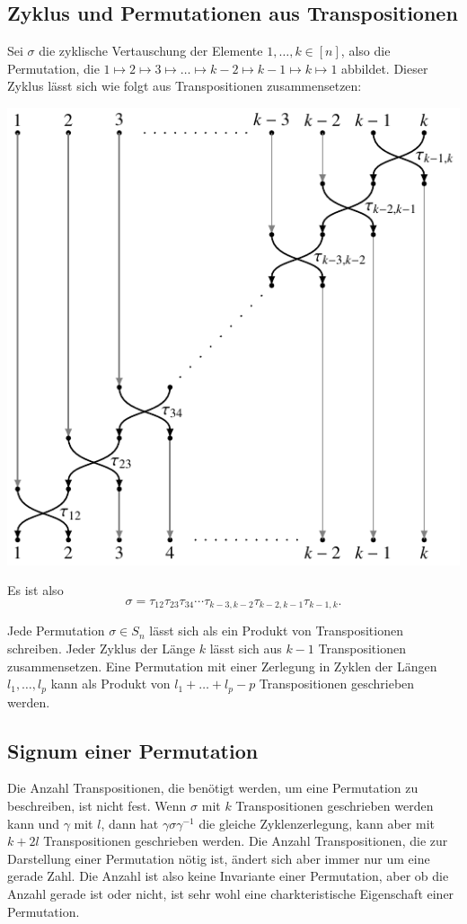 \subsection{Zyklus und Permutationen aus Transpositionen}
Sei $\sigma$ die zyklische Vertauschung der Elemente $1,\dots,k\in [n]$,
also die Permutation, die
$1\mapsto2\mapsto3\mapsto\dots\mapsto k-2\mapsto k-1\mapsto k\mapsto 1$
abbildet.
Dieser Zyklus lässt sich wie folgt aus Transpositionen zusammensetzen:
\begin{center}
\includegraphics{chapters/50-permutationen/images/transpositionen.pdf}
\end{center}
Es ist also
\[
\sigma 
=
\tau_{12} \tau_{23} \tau_{34} \cdots \tau_{k-3,k-2} \tau_{k-2,k-1} \tau_{k-1,k}.
\]
\begin{satz}
Jede Permutation $\sigma\in S_n$ lässt sich als ein Produkt von 
Transpositionen schreiben.
Jeder Zyklus der Länge $k$ lässt sich aus $k-1$ Transpositionen
zusammensetzen.
Eine Permutation mit einer Zerlegung in Zyklen der Längen $l_1,\dots,l_p$
kann als Produkt von $l_1+\dots+l_p-p$ Transpositionen geschrieben werden.
\end{satz}

\subsection{Signum einer Permutation}
Die Anzahl Transpositionen, die benötigt werden, um eine Permutation
zu beschreiben, ist nicht fest. 
Wenn $\sigma$ mit $k$ Transpositionen geschrieben werden kann und
$\gamma$ mit $l$, dann hat $\gamma\sigma\gamma^{-1}$ die gleiche
Zyklenzerlegung, kann aber mit $k+2l$ Transpositionen geschrieben
werden.
Die Anzahl Transpositionen, die zur Darstellung einer Permutation
nötig ist, ändert sich aber immer nur um eine gerade Zahl.
Die Anzahl ist also keine Invariante einer Permutation, aber ob
die Anzahl gerade ist oder nicht, ist sehr wohl eine charkteristische
Eigenschaft einer Permutation.


